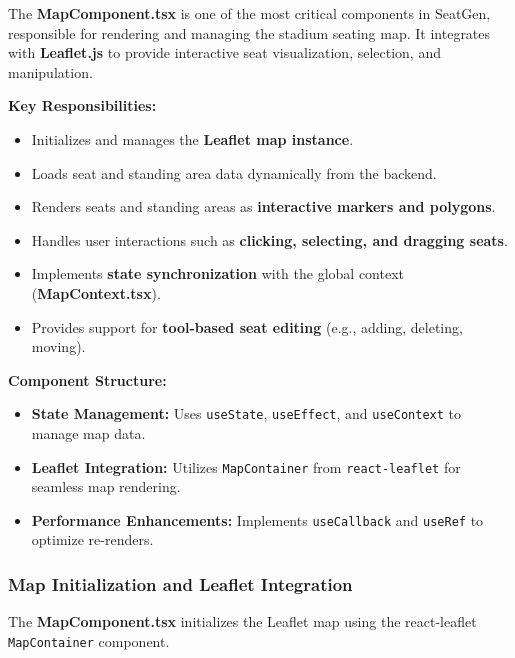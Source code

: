 

The \textbf{MapComponent.tsx} is one of the most critical components in SeatGen, responsible for rendering and managing the stadium seating map. It integrates with \textbf{Leaflet.js} to provide interactive seat visualization, selection, and manipulation.

\textbf{Key Responsibilities:}
\begin{itemize}
    \item Initializes and manages the \textbf{Leaflet map instance}.
    \item Loads seat and standing area data dynamically from the backend.
    \item Renders seats and standing areas as \textbf{interactive markers and polygons}.
    \item Handles user interactions such as \textbf{clicking, selecting, and dragging seats}.
    \item Implements \textbf{state synchronization} with the global context (\textbf{MapContext.tsx}).
    \item Provides support for \textbf{tool-based seat editing} (e.g., adding, deleting, moving).
\end{itemize}

\textbf{Component Structure:}
\begin{itemize}
    \item \textbf{State Management:} Uses \texttt{useState}, \texttt{useEffect}, and \texttt{useContext} to manage map data.
    \item \textbf{Leaflet Integration:} Utilizes \texttt{MapContainer} from \texttt{react-leaflet} for seamless map rendering.
    \item \textbf{Performance Enhancements:} Implements \texttt{useCallback} and \texttt{useRef} to optimize re-renders.
\end{itemize}

\subsubsection{Map Initialization and Leaflet Integration}

The \textbf{MapComponent.tsx} initializes the Leaflet map using the react-leaflet \texttt{MapContainer} component.

